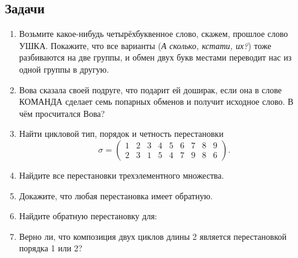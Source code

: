 \subsection*{Задачи}
\begin{enumerate}
    \item Возьмите какое-нибудь четырёхбуквенное слово, скажем, прошлое слово \textsf{УШКА}.
        Покажите, что все варианты (\emph{А сколько, кстати, их?}) тоже разбиваются на две группы,
        и обмен двух букв местами переводит нас из одной группы в другую.
    \item Вова сказала своей подруге, что подарит ей доширак,
        если она в слове \textsf{КОМАНДА} сделает семь попарных обменов и получит исходное слово.
        В чём просчитался Вова?
    \item Найти цикловой тип, порядок и четность перестановки
        \[
            \sigma = \begin{pmatrix}
                1 & 2 & 3 & 4 & 5 & 6 & 7 & 8 & 9 \\
                2 & 3 & 1 & 5 & 4 & 7 & 9 & 8 & 6
            \end{pmatrix}.
        \]
    \item Найдите все перестановки трехэлементного множества.
    \item Докажите, что любая перестановка имеет обратную.
    \item Найдите обратную перестановку для: 

    \item Верно ли, что композиция двух циклов длины 2 является перестановкой порядка 1 или 2?
\end{enumerate}
